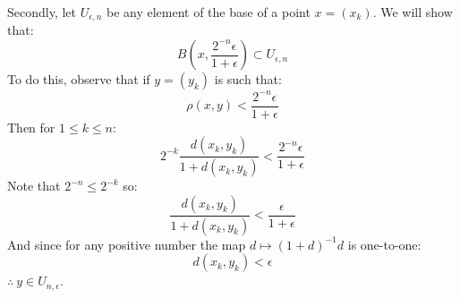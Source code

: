 Secondly, let $U_{\epsilon, n}$ be any element of the base of a point $x=(x_k)$. We will show that:
$$B\left(x,\frac{2^{-n}\epsilon}{1+\epsilon}\right) \subset U_{\epsilon, n}$$
To do this, observe that if $y=(y_k)$ is such that:
$$\rho(x,y)<\frac{2^{-n}\epsilon}{1+\epsilon}$$
Then for $1\leq k \leq n$:
$$2^{-k} \frac{d(x_k,y_k)}{1+d(x_k,y_k)} < \frac{2^{-n}\epsilon}{1+\epsilon}$$
Note that $2^{-n}\leq 2^{-k}$ so:
$$ \frac{d(x_k,y_k)}{1+d(x_k,y_k)} < \frac{\epsilon}{1+\epsilon}$$
And since for any positive number the map $d\mapsto (1+d)^{-1}d$ is one-to-one:
$$d(x_k,y_k)<\epsilon$$
$\therefore \ y\in U_{n,\epsilon}$.
